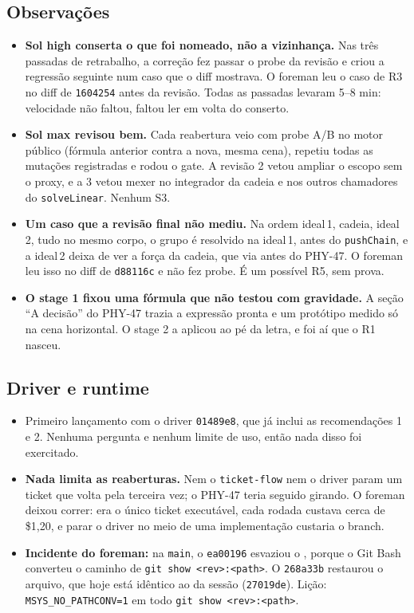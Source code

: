 \documentclass[11pt,a4paper]{article}
\begin{document}
\subsection{Observações}
\begin{itemize}
  \item \textbf{Sol high conserta o que foi nomeado, não a vizinhança.} Nas três
        passadas de retrabalho, a correção fez passar o probe da revisão e
        criou a regressão seguinte num caso que o diff mostrava. O foreman
        leu o caso de R3 no diff de \texttt{1604254} antes da revisão. Todas as
        passadas levaram 5--8 min: velocidade não faltou, faltou ler em volta
        do conserto.
  \item \textbf{Sol max revisou bem.} Cada reabertura veio com probe A/B
        no motor público (fórmula anterior contra a nova, mesma cena), repetiu
        todas as mutações registradas e rodou o gate. A revisão 2 vetou ampliar
        o escopo sem o proxy, e a 3 vetou mexer no integrador da cadeia e nos
        outros chamadores do \texttt{solveLinear}. Nenhum S3.
  \item \textbf{Um caso que a revisão final não mediu.} Na ordem
        ideal\,1, cadeia, ideal\,2, tudo no mesmo corpo, o grupo é resolvido
        na ideal\,1, antes do \texttt{pushChain}, e a ideal\,2 deixa de ver a
        força da cadeia, que via antes do PHY-47. O foreman leu isso no diff
        de \texttt{d88116c} e não fez probe. É um possível R5, sem prova.
  \item \textbf{O stage 1 fixou uma fórmula que não testou com gravidade.} A
        seção ``A decisão'' do PHY-47 trazia a expressão pronta e um
        protótipo medido só na cena horizontal. O stage 2 a aplicou ao pé da
        letra, e foi aí que o R1 nasceu.
\end{itemize}

\subsection{Driver e runtime}
\begin{itemize}
  \item Primeiro lançamento com o driver \texttt{01489e8}, que já inclui as
        recomendações 1 e 2. Nenhuma pergunta e nenhum limite de uso, então
        nada disso foi exercitado.
  \item \textbf{Nada limita as reaberturas.} Nem o \texttt{ticket-flow} nem o
        driver param um ticket que volta pela terceira vez; o PHY-47 teria
        seguido girando. O foreman deixou correr: era o único ticket
        executável, cada rodada custava cerca de \$1,20, e parar o driver no
        meio de uma implementação custaria o branch.
  \item \textbf{Incidente do foreman:} na \texttt{main}, o \texttt{ea00196}
        esvaziou o , porque o Git Bash
        converteu o caminho de \texttt{git show <rev>:<path>}. O
        \texttt{268a33b} restaurou o arquivo, que hoje está idêntico ao da
        sessão (\texttt{27019de}). Lição: \texttt{MSYS\_NO\_PATHCONV=1} em
        todo \texttt{git show <rev>:<path>}.
\end{itemize}
\end{document}
